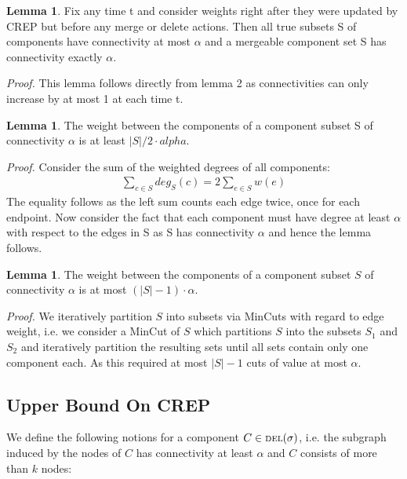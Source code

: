 \documentclass[xcolor=dvipsnames, tikz, 11pt]{article}
\newcommand{\crep}{C{\scriptsize REP}}
\newcommand{\del}{\text{\scriptsize DEL}}
\theoremstyle{definition}
\newtheorem{lemma}[defi]{Lemma}
\begin{document}
\begin{lemma}
	\label{mergeable_lemma}
	Fix any time t and consider weights right after they were updated by \crep{} but before any merge or delete actions. Then all true subsets S of components have connectivity at most $\alpha$ and a mergeable component set S has connectivity exactly $\alpha$.
\end{lemma}

\textit{Proof.} This lemma follows directly from lemma 2 as connectivities can only increase by at most 1 at each time t.

\begin{lemma}
	\label{cut_lemma}
	The weight between the components of a component subset S of connectivity $\alpha$ is at least $|S|/2 \cdot alpha$.
\end{lemma}
\textit{Proof.} Consider the sum of the weighted degrees of all components:
\begin{align*}
\sum_{c\in S}deg_S(c)=2\sum_{e\in S}w(e)
\end{align*}
The equality follows as the left sum counts each edge twice, once for each endpoint.
Now consider the fact that each component must have degree at least $\alpha$ with respect to the edges in S as S has connectivity $\alpha$ and hence the lemma follows.

\begin{lemma}
	\label{cut_lemma_upper}
	The weight between the components of a component subset $S$ of connectivity $\alpha$ is at most $(|S|-1)\cdot\alpha$.
\end{lemma}
\textit{Proof.} We iteratively partition $S$ into subsets via MinCuts with regard to edge weight, i.e. we consider a MinCut of $S$ which partitions $S$ into the subsets $S_1$ and $S_2$ and iteratively partition the resulting sets until all sets contain only one component each. As this required at most $|S|-1$ cuts of value at most $\alpha$.

\subsection{Upper Bound On \crep{}}

We define the following notions for a component $C\in\del{}(\sigma)$, i.e. the subgraph induced by the nodes of $C$ has connectivity at least $\alpha$ and $C$ consists of more than $k$ nodes:
\end{document}
